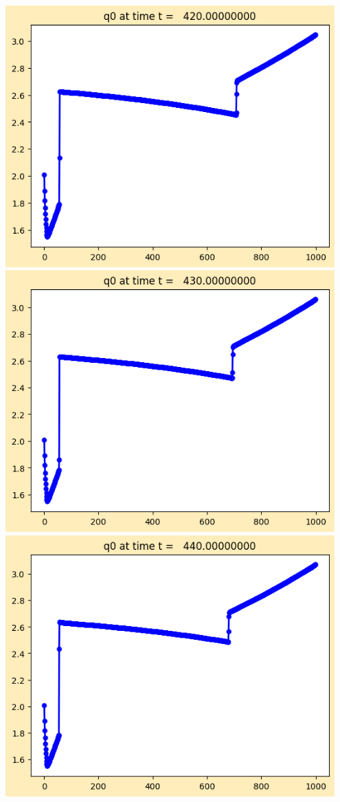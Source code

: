 \documentclass[11pt]{article}
\begin{document}
\vskip 10pt 
\includegraphics[width=0.95\textwidth]{frame0042fig1.png}
\vskip 10pt 
\includegraphics[width=0.95\textwidth]{frame0043fig1.png}
\vskip 10pt 
\includegraphics[width=0.95\textwidth]{frame0044fig1.png}
\end{document}
